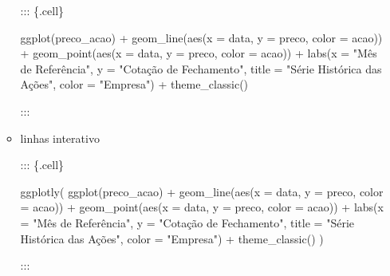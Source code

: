 \documentclass[
  letterpaper,
  DIV=11,
  numbers=noendperiod]{scrreprt}
\newenvironment{Shaded}{\begin{snugshade}}{\end{snugshade}}
\newcommand{\AttributeTok}[1]{\textcolor[rgb]{0.40,0.45,0.13}{#1}}
\newcommand{\FunctionTok}[1]{\textcolor[rgb]{0.28,0.35,0.67}{#1}}
\newcommand{\NormalTok}[1]{\textcolor[rgb]{0.00,0.23,0.31}{#1}}
\newcommand{\SpecialCharTok}[1]{\textcolor[rgb]{0.37,0.37,0.37}{#1}}
\newcommand{\StringTok}[1]{\textcolor[rgb]{0.13,0.47,0.30}{#1}}
\begin{document}
\begin{itemize}
\begin{itemize}
    ::: \{.cell\}

\begin{Shaded}
\begin{Highlighting}[]
    \FunctionTok{ggplot}\NormalTok{(preco\_acao) }\SpecialCharTok{+}
        \FunctionTok{geom\_line}\NormalTok{(}\FunctionTok{aes}\NormalTok{(}\AttributeTok{x =}\NormalTok{ data, }\AttributeTok{y =}\NormalTok{ preco, }\AttributeTok{color =}\NormalTok{ acao)) }\SpecialCharTok{+} 
        \FunctionTok{geom\_point}\NormalTok{(}\FunctionTok{aes}\NormalTok{(}\AttributeTok{x =}\NormalTok{ data, }\AttributeTok{y =}\NormalTok{ preco, }\AttributeTok{color =}\NormalTok{ acao)) }\SpecialCharTok{+}
        \FunctionTok{labs}\NormalTok{(}\AttributeTok{x =} \StringTok{"Mês de Referência"}\NormalTok{,}
            \AttributeTok{y =} \StringTok{"Cotação de Fechamento"}\NormalTok{,}
            \AttributeTok{title =} \StringTok{"Série Histórica das Ações"}\NormalTok{,}
            \AttributeTok{color =} \StringTok{"Empresa"}\NormalTok{) }\SpecialCharTok{+}
        \FunctionTok{theme\_classic}\NormalTok{()}
\end{Highlighting}
\end{Shaded}

    :::
  \item
    linhas interativo

    ::: \{.cell\}

\begin{Shaded}
\begin{Highlighting}[]
    \FunctionTok{ggplotly}\NormalTok{(}
        \FunctionTok{ggplot}\NormalTok{(preco\_acao) }\SpecialCharTok{+}
        \FunctionTok{geom\_line}\NormalTok{(}\FunctionTok{aes}\NormalTok{(}\AttributeTok{x =}\NormalTok{ data, }\AttributeTok{y =}\NormalTok{ preco, }\AttributeTok{color =}\NormalTok{ acao)) }\SpecialCharTok{+} 
        \FunctionTok{geom\_point}\NormalTok{(}\FunctionTok{aes}\NormalTok{(}\AttributeTok{x =}\NormalTok{ data, }\AttributeTok{y =}\NormalTok{ preco, }\AttributeTok{color =}\NormalTok{ acao)) }\SpecialCharTok{+}
        \FunctionTok{labs}\NormalTok{(}\AttributeTok{x =} \StringTok{"Mês de Referência"}\NormalTok{,}
            \AttributeTok{y =} \StringTok{"Cotação de Fechamento"}\NormalTok{,}
            \AttributeTok{title =} \StringTok{"Série Histórica das Ações"}\NormalTok{,}
            \AttributeTok{color =} \StringTok{"Empresa"}\NormalTok{) }\SpecialCharTok{+}
        \FunctionTok{theme\_classic}\NormalTok{()}
\NormalTok{        )}
\end{Highlighting}
\end{Shaded}

    :::
  \end{itemize}
\end{itemize}
\end{document}
